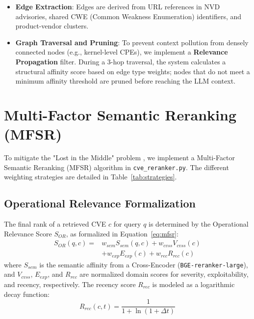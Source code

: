 \begin{itemize}
    \item \textbf{Edge Extraction}: Edges are derived from URL references in NVD advisories, shared CWE (Common Weakness Enumeration) identifiers, and product-vendor clusters.
    \item \textbf{Graph Traversal and Pruning}: To prevent context pollution from densely connected nodes (e.g., kernel-level CPEs), we implement a \textbf{Relevance Propagation} filter. During a 3-hop traversal, the system calculates a structural affinity score based on edge type weights; nodes that do not meet a minimum affinity threshold are pruned before reaching the LLM context.
\end{itemize}

\section{Multi-Factor Semantic Reranking (MFSR)}
\label{sec:reranking}
To mitigate the "Lost in the Middle" problem \cite{lostmiddle}, we implement a Multi-Factor Semantic Reranking (MFSR) algorithm in \texttt{cve\_reranker.py}. The different weighting strategies are detailed in Table~\ref{tab:strategies}.

\begin{table}[htbp]
    \centering
    \caption{Multi-Factor Semantic Reranking (MFSR) Strategy Matrix}
    \label{tab:strategies}
    \resizebox{\columnwidth}{!}{}
\end{table}

\subsection{Operational Relevance Formalization}
The final rank of a retrieved CVE $c$ for query $q$ is determined by the Operational Relevance Score $S_{OR}$, as formalized in Equation~\ref{eq:mfsr}:
\begin{equation}
\begin{aligned}
S_{OR}(q, c) = & w_{sem} S_{sem}(q, c) + w_{cvss} V_{cvss}(c) \\
& + w_{exp} E_{exp}(c) + w_{rec} R_{rec}(c)
\end{aligned}
\label{eq:mfsr}
\end{equation}
where $S_{sem}$ is the semantic affinity from a Cross-Encoder (\texttt{BGE-reranker-large}), and $V_{cvss}$, $E_{exp}$, and $R_{rec}$ are normalized domain scores for severity, exploitability, and recency, respectively. The recency score $R_{rec}$ is modeled as a logarithmic decay function:
\begin{equation}
R_{rec}(c, t) = \frac{1}{1 + \ln(1 + \Delta t)}
\label{eq:recency}
\end{equation}

